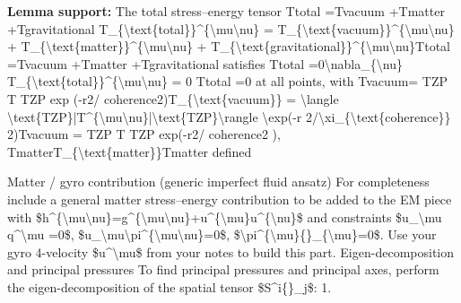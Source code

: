 \textbf{Lemma support:} The total stress--energy tensor Ttotal  =Tvacuum  +Tmatter  +Tgravitational  T\_\{\textbackslash{}text\{total\}\}\textasciicircum{}\{\textbackslash{}mu\textbackslash{}nu\} = T\_\{\textbackslash{}text\{vacuum\}\}\textasciicircum{}\{\textbackslash{}mu\textbackslash{}nu\} + T\_\{\textbackslash{}text\{matter\}\}\textasciicircum{}\{\textbackslash{}mu\textbackslash{}nu\} + T\_\{\textbackslash{}text\{gravitational\}\}\textasciicircum{}\{\textbackslash{}mu\textbackslash{}nu\}Ttotal   =Tvacuum   +Tmatter   +Tgravitational   satisfies   Ttotal  =0\textbackslash{}nabla\_\{\textbackslash{}nu\} T\_\{\textbackslash{}text\{total\}\}\textasciicircum{}\{\textbackslash{}mu\textbackslash{}nu\} = 0   Ttotal   =0 at all points, with Tvacuum= TZP T   TZP exp (-r2/ coherence2)T\_\{\textbackslash{}text\{vacuum\}\} = \textbackslash{}langle \textbackslash{}text\{TZP\}|T\textasciicircum{}\{\textbackslash{}mu\textbackslash{}nu\}|\textbackslash{}text\{TZP\}\textbackslash{}rangle \textbackslash{}exp(-r 2/\textbackslash{}xi\_\{\textbackslash{}text\{coherence\}\} 2)Tvacuum = TZP T   TZP exp(-r2/ coherence2 ), TmatterT\_\{\textbackslash{}text\{matter\}\}Tmatter defined\par
\endgroup

Matter / gyro contribution (generic imperfect fluid ansatz) For completeness include a general matter stress--energy contribution to be added to the EM piece with \$h\textasciicircum{}\{\textbackslash{}mu\textbackslash{}nu\}=g\textasciicircum{}\{\textbackslash{}mu\textbackslash{}nu\}+u\textasciicircum{}\{\textbackslash{}mu\}u\textasciicircum{}\{\textbackslash{}nu\}\$ and constraints \$u\_\textbackslash{}mu q\textasciicircum{}\textbackslash{}mu =0\$, \$u\_\textbackslash{}mu\textbackslash{}pi\textasciicircum{}\{\textbackslash{}mu\textbackslash{}nu\}=0\$, \$\textbackslash{}pi\textasciicircum{}\{\textbackslash{}mu\}\{\}\_\{\textbackslash{}mu\}=0\$. Use your gyro 4-velocity \$u\textasciicircum{}\textbackslash{}mu\$ from your notes to build this part. Eigen-decomposition and principal pressures To find principal pressures and principal axes, perform the eigen-decomposition of the spatial tensor \$S\textasciicircum{}i\{\}\_j\$: 1.

